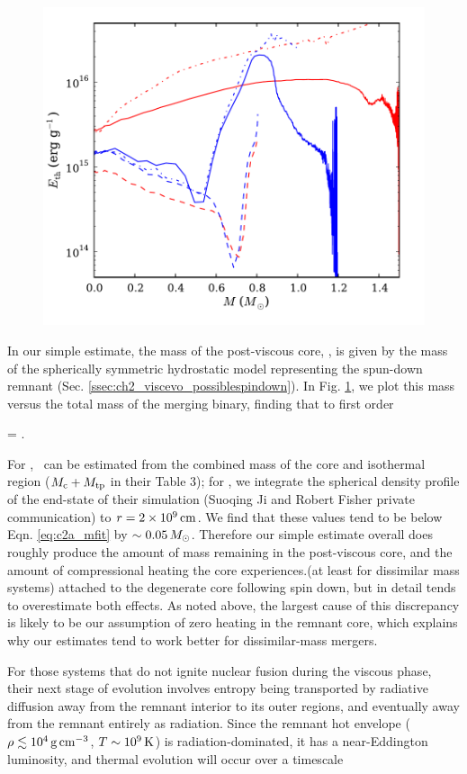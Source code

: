 \begin{figure}
\centering
\includegraphics[angle=0,width=0.5\columnwidth]{chapter2_zhu+13/figures/heatingTEC.pdf}
\caption{}
\label{fig:c2a_mcpvvsmtot}
\end{figure}

In our simple estimate, the mass of the post-viscous core, \Mcpv, is given by the mass of the spherically symmetric hydrostatic model representing the spun-down remnant (Sec. \ref{ssec:ch2_viscevo_possiblespindown}).  In Fig. \ref{fig:c2a_mcpvvsmtot}, we plot this mass versus the total mass of the merging binary, finding that to first order

\eqbegin
\Mcpv = .
\label{eq:c2a_mfit}
\eqend

\noindent For \cite{schw+12}, \Mcpv\ can be estimated from the combined mass of the core and isothermal region ($M_\mathrm{c} + M_\mathrm{tp}$ in their Table 3); for \cite{ji+13}, we integrate the spherical density profile of the end-state of their simulation (Suoqing Ji and Robert Fisher private communication) to $r = 2\times10^9\,\mathrm{cm}$.  We find that these values tend to be below Eqn. \ref{eq:c2a_mfit} by $\sim0.05\,\Msun$.  Therefore our simple estimate overall does roughly produce the amount of mass remaining in the post-viscous core, and the amount of compressional heating the core experiences.(at least for dissimilar mass systems) attached to the degenerate core following spin down, but in detail tends to overestimate both effects.  As noted above, the largest cause of this discrepancy is likely to be our assumption of zero heating in the remnant core, which explains why our estimates tend to work better for dissimilar-mass mergers.

For those systems that do not ignite nuclear fusion during the viscous phase, their next stage of evolution involves entropy being transported by radiative diffusion away from the remnant interior to its outer regions, and eventually away from the remnant entirely as radiation.  Since the remnant hot envelope ($\rho \lesssim 10^4\,\gcc$, $T \sim 10^9\,\mathrm{K}$) is radiation-dominated, it has a near-Eddington luminosity, and thermal evolution will occur over a timescale \citep{shen+12}

